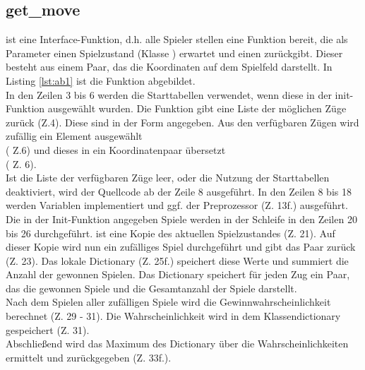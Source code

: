\subsection{get\_move}
  ist eine Interface-Funktion, d.h. alle Spieler stellen eine Funktion  bereit, die als Parameter einen Spielzustand (Klasse ) erwartet und einen  zurückgibt. Dieser besteht aus einem Paar, das die Koordinaten auf dem Spielfeld darstellt. In Listing \ref{lst:ab1} ist die Funktion abgebildet.
\vspace{0.5cm}
\\In den Zeilen 3 bis 6 werden die Starttabellen verwendet, wenn diese in der init-Funktion ausgewählt wurden. Die Funktion  gibt eine Liste der möglichen Züge zurück (Z.4). Diese sind in der Form  angegeben. Aus den verfügbaren Zügen wird zufällig ein Element ausgewählt \\( Z.6) und dieses in ein Koordinatenpaar übersetzt \\( Z. 6). 
\\Ist die Liste der verfügbaren Züge leer, oder die Nutzung der Starttabellen deaktiviert, wird der Quellcode ab der Zeile 8 ausgeführt. In den Zeilen 8 bis 18 werden Variablen implementiert und ggf. der Preprozessor (Z. 13f.) ausgeführt.
\\Die in der Init-Funktion angegeben  Spiele werden in der Schleife in den Zeilen 20 bis 26 durchgeführt.
 ist eine Kopie des aktuellen Spielzustandes (Z. 21). Auf dieser Kopie wird nun ein zufälliges Spiel durchgeführt und gibt das Paar  zurück (Z. 23). Das lokale Dictionary  (Z. 25f.) speichert diese Werte und summiert die Anzahl der gewonnen Spielen.
Das Dictionary speichert für jeden Zug ein Paar, das die gewonnen Spiele und die Gesamtanzahl der Spiele darstellt.
\\ Nach dem Spielen aller zufälligen Spiele wird die Gewinnwahrscheinlichkeit berechnet (Z. 29 - 31). Die Wahrscheinlichkeit wird in dem Klassendictionary  gespeichert (Z. 31).
\\Abschließend wird das Maximum des Dictionary über die Wahrscheinlichkeiten ermittelt und zurückgegeben (Z. 33f.).

